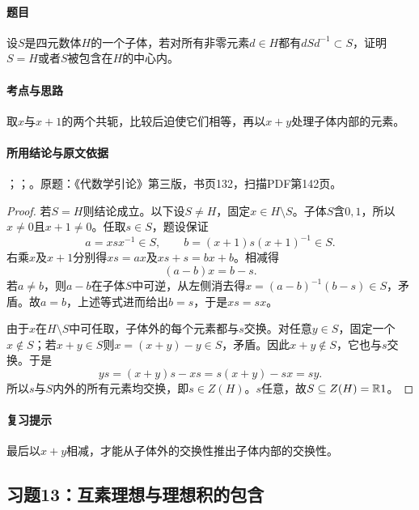 \label{ex:3:12}

\paragraph{题目}

设$S$是四元数体$H$的一个子体，若对所有非零元素$d\in H$都有$dSd^{-1}\subset S$，证明$S=H$或者$S$被包含在$H$的中心内。

\paragraph{考点与思路}

取$x$与$x+1$的两个共轭，比较后迫使它们相等，再以$x+y$处理子体内部的元素。

\paragraph{所用结论与原文依据}

；；。原题：《代数学引论》第三版，书页132，扫描PDF第142页。


\begin{proof}

若$S=H$则结论成立。以下设$S\ne H$，固定$x\in H\setminus S$。子体$S$含$0,1$，所以$x\ne0$且$x+1\ne0$。任取$s\in S$，题设保证
\[
a=xsx^{-1}\in S,\qquad b=(x+1)s(x+1)^{-1}\in S.
\]
右乘$x$及$x+1$分别得$xs=ax$及$xs+s=bx+b$。相减得
\[
(a-b)x=b-s.
\]
若$a\ne b$，则$a-b$在子体$S$中可逆，从左侧消去得$x=(a-b)^{-1}(b-s)\in S$，矛盾。故$a=b$，上述等式进而给出$b=s$，于是$xs=sx$。

由于$x$在$H\setminus S$中可任取，子体外的每个元素都与$s$交换。对任意$y\in S$，固定一个$x\notin S$；若$x+y\in S$则$x=(x+y)-y\in S$，矛盾。因此$x+y\notin S$，它也与$s$交换。于是
\[
ys=(x+y)s-xs=s(x+y)-sx=sy.
\]
所以$s$与$S$内外的所有元素均交换，即$s\in Z(H)$。$s$任意，故$S\subseteq Z(H)=\mathbb R1$。

\end{proof}

\paragraph{复习提示}

最后以$x+y$相减，才能从子体外的交换性推出子体内部的交换性。



\subsection{习题13：互素理想与理想积的包含}

